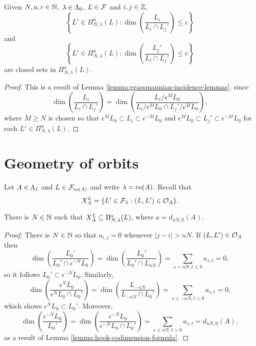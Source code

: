 \documentclass[a4paper, 11pt, twoside]{report}
\begin{document}
\begin{lemma}\label{lemma:incidence-varieties-consequences}
Given $N,a,c\in\naturals$, $\lambda\in\compositions$, $L\in\flags$ and $i,j\in\integers$,
\begin{equation*}
\left\{L'\in\Pi_{N,\lambda}^a(L):\dim\left(\frac{L_i}{L_i\cap L_j'}\right)\le c\right\}
\end{equation*}
and
\begin{equation*}
\left\{L'\in\Pi_{N,\lambda}^a(L): \dim\left(\frac{L_j'}{L_i\cap L_j'}\right)\le c\right\}
\end{equation*}
are closed sets in $\Pi_{N,\lambda}^a(L)$.
\end{lemma}

\begin{proof}
This is a result of Lemma \ref{lemma:grassmannian-incidence-lemmas}, since
\begin{equation*}
\dim\left(\frac{L_i}{L_i\cap L_j'}\right) = \dim\left(\frac{L_i/{\epsilon^M L_0}}{L_i/{\epsilon^M L_0}\cap L_j'/{\epsilon^M L_0}}\right),
\end{equation*}
where $M\geq N$ is chosen so that $\epsilon^M L_0\subset L_i\subset\epsilon^{-M}L_0$ and $\epsilon^M L_0\subset L_j'\subset\epsilon^{-M}L_0$ for each $L'\in\Pi_{N,\lambda}^a(L)$.
\end{proof}


\section{Geometry of orbits}

Let $A\in\matrices$ and $L\in\flags_{\ro{A}}$ and write $\lambda=\co{A}$. Recall that
\begin{equation*}
\xprod[L]{A} = \{L'\in\flags_\lambda: (L,L')\in\orbit{A}\}.
\end{equation*}

\begin{lemma}\label{lemma:bounded-orbits}
There is $N\in\naturals$ such that $\xprod[L]{A}\subset\Pi_{N,\lambda}^a(L)$, where $a=d_{nN,0}{(A)}$.
\end{lemma}

\begin{proof}
There is $N\in\naturals$ so that $a_{i,j}=0$ whenever $|j-i|>nN$. If $(L,L')\in\orbit{A}$ then
\begin{equation*}
\dim\left(\frac{L_0'}{L_0'\cap\epsilon^{-N}L_0}\right) = \dim\left(\frac{L_0'}{L_0'\cap L_{nN}}\right) = \sum_{s>nN,t\le 0} a_{s,t} = 0,
\end{equation*}
so it follows $L_0'\subset\epsilon^{-N}L_0$. Similarly,
\begin{equation*}
\dim\left(\frac{\epsilon^N L_0}{\epsilon^N L_0\cap L_0'}\right) = \dim\left(\frac{L_{-nN}}{L_{-nN}\cap L_0'}\right) = \sum_{s\le -nN,t>0} a_{s,t} = 0,
\end{equation*}
which shows $\epsilon^N L_0\subset L_0'$. Moreover,
\begin{equation*}
\dim\left(\frac{\epsilon^{-N}L_0}{L_0'}\right) = \dim\left(\frac{\epsilon^{-N}L_0}{\epsilon^{-N}L_0\cap L_0'}\right) = \sum_{s\le nN,t>0}a_{s,t} = d_{nN,0}(A),
\end{equation*}
as a result of Lemma \ref{lemma:hook-codimension-formula}. 
\end{proof}
\end{document}
